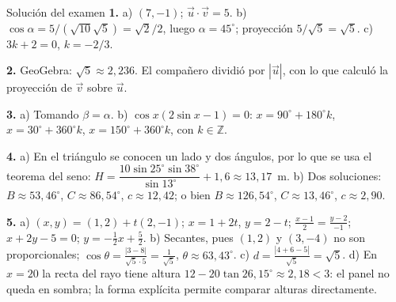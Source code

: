 \begin{tarjeta}{Solución del examen}
\small
\textbf{1.} a) $(7,-1)$; $\vec u\cdot\vec v=5$. b) $\cos\alpha=5/(\sqrt{10}\sqrt5)=\sqrt2/2$, luego $\alpha=45^\circ$; proyección $5/\sqrt5=\sqrt5$. c) $3k+2=0$, $k=-2/3$.

\textbf{2.} GeoGebra: $\sqrt5\approx2{,}236$. El compañero dividió por $|\vec u|$, con lo que calculó la proyección de $\vec v$ sobre $\vec u$.

\textbf{3.} a) Tomando $\beta=\alpha$. b) $\cos x(2\sin x-1)=0$: $x=90^\circ+180^\circ k$, $x=30^\circ+360^\circ k$, $x=150^\circ+360^\circ k$, con $k\in\mathbb Z$.

\textbf{4.} a) En el triángulo se conocen un lado y dos ángulos, por lo que se usa el teorema del seno: $H=\dfrac{10\sin25^\circ\sin38^\circ}{\sin13^\circ}+1{,}6\approx13{,}17$~m. b) Dos soluciones: $B\approx53{,}46^\circ$, $C\approx86{,}54^\circ$, $c\approx12{,}42$; o bien $B\approx126{,}54^\circ$, $C\approx13{,}46^\circ$, $c\approx2{,}90$.

\textbf{5.} a) $(x,y)=(1,2)+t(2,-1)$; $x=1+2t$, $y=2-t$; $\frac{x-1}{2}=\frac{y-2}{-1}$; $x+2y-5=0$; $y=-\frac12x+\frac52$. b) Secantes, pues $(1,2)$ y $(3,-4)$ no son proporcionales; $\cos\theta=\frac{|3-8|}{\sqrt5\cdot5}=\frac1{\sqrt5}$, $\theta\approx63{,}43^\circ$. c) $d=\frac{|4+6-5|}{\sqrt5}=\sqrt5$. d) En $x=20$ la recta del rayo tiene altura $12-20\tan26{,}15^\circ\approx2{,}18<3$: el panel no queda en sombra; la forma explícita permite comparar alturas directamente.
\end{tarjeta}
